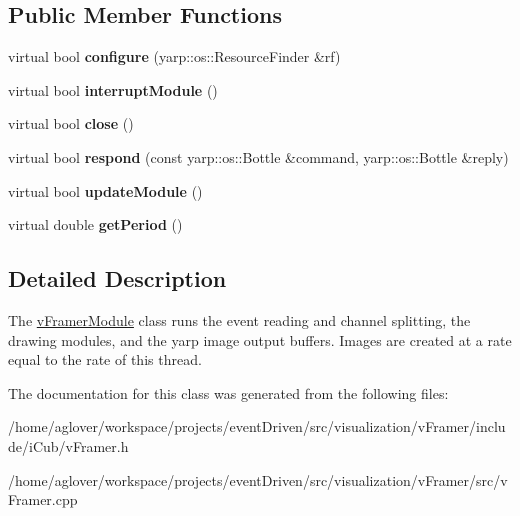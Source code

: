 \subsection*{Public Member Functions}
\begin{DoxyCompactItemize}
\item 
\hypertarget{classemorph_1_1vFramerModule_a0774b49c29a6bf00c3a269573c1e8bb0}{virtual bool {\bfseries configure} (yarp\-::os\-::\-Resource\-Finder \&rf)}\label{classemorph_1_1vFramerModule_a0774b49c29a6bf00c3a269573c1e8bb0}

\item 
\hypertarget{classemorph_1_1vFramerModule_a9718c0d118f0603c131e9033298fa303}{virtual bool {\bfseries interrupt\-Module} ()}\label{classemorph_1_1vFramerModule_a9718c0d118f0603c131e9033298fa303}

\item 
\hypertarget{classemorph_1_1vFramerModule_a6e106a5b6b4bd41fbf3d68ea9a8069b1}{virtual bool {\bfseries close} ()}\label{classemorph_1_1vFramerModule_a6e106a5b6b4bd41fbf3d68ea9a8069b1}

\item 
\hypertarget{classemorph_1_1vFramerModule_a143d9b10c0450a1e1fdd2be472f3c651}{virtual bool {\bfseries respond} (const yarp\-::os\-::\-Bottle \&command, yarp\-::os\-::\-Bottle \&reply)}\label{classemorph_1_1vFramerModule_a143d9b10c0450a1e1fdd2be472f3c651}

\item 
\hypertarget{classemorph_1_1vFramerModule_aa6d5d465684f59f9eada49e8b8abae59}{virtual bool {\bfseries update\-Module} ()}\label{classemorph_1_1vFramerModule_aa6d5d465684f59f9eada49e8b8abae59}

\item 
\hypertarget{classemorph_1_1vFramerModule_a91b423c2b14eb2ad9f4bb5e25dbfd01b}{virtual double {\bfseries get\-Period} ()}\label{classemorph_1_1vFramerModule_a91b423c2b14eb2ad9f4bb5e25dbfd01b}

\end{DoxyCompactItemize}


\subsection{Detailed Description}
The \hyperlink{classemorph_1_1vFramerModule}{v\-Framer\-Module} class runs the event reading and channel splitting, the drawing modules, and the yarp image output buffers. Images are created at a rate equal to the rate of this thread. 

The documentation for this class was generated from the following files\-:\begin{DoxyCompactItemize}
\item 
/home/aglover/workspace/projects/event\-Driven/src/visualization/v\-Framer/include/i\-Cub/v\-Framer.\-h\item 
/home/aglover/workspace/projects/event\-Driven/src/visualization/v\-Framer/src/v\-Framer.\-cpp\end{DoxyCompactItemize}
